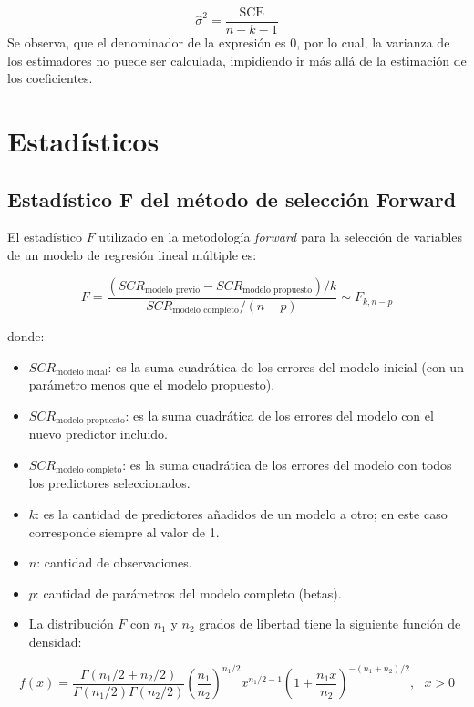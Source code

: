 \documentclass[
  11pt,
]{book}
\providecommand{\tightlist}{%
  \setlength{\itemsep}{0pt}\setlength{\parskip}{0pt}}
\theoremstyle{definition}
\theoremstyle{definition}
\theoremstyle{definition}
\theoremstyle{definition}
\theoremstyle{remark}
\begin{document}
\[
\widehat{\sigma}^2 = \frac{\text{SCE}}{n-k-1}
\]
Se observa, que el denominador de la expresión es 0, por lo cual, la varianza de los estimadores no puede ser calculada, impidiendo ir más allá de la estimación de los coeficientes.

\chapter{Estadísticos}\label{estaduxedsticos}

\section{Estadístico F del método de selección Forward}\label{F-forward}

El estadístico \(F\) utilizado en la metodología \emph{forward} para la selección de variables de un modelo de regresión lineal múltiple es:

\begin{equation}
F = \displaystyle\frac{(SCR_{\text{modelo previo}} - SCR_{\text{modelo propuesto}})/k}{SCR_{\text{modelo completo}}/(n-p)} \sim F_{k, n-p}
\label{eq:EstadisticoFforward}
\end{equation}

donde:

\begin{itemize}
\tightlist
\item
  \(SCR_{\text{modelo incial}}\): es la suma cuadrática de los errores del modelo inicial (con un parámetro menos que el modelo propuesto).
\item
  \(SCR_{\text{modelo propuesto}}\): es la suma cuadrática de los errores del modelo con el nuevo predictor incluido.
\item
  \(SCR_{\text{modelo completo}}\): es la suma cuadrática de los errores del modelo con todos los predictores seleccionados.
\item
  \(k\): es la cantidad de predictores añadidos de un modelo a otro; en este caso corresponde siempre al valor de 1.
\item
  \(n\): cantidad de observaciones.
\item
  \(p\): cantidad de parámetros del modelo completo (betas).
\item
  La distribución \(F\) con \(n_1\) y \(n_2\) grados de libertad tiene la siguiente función de densidad:
\end{itemize}

\begin{equation}
f(x) = \frac{\Gamma(n_1/2+n_2/2)}{\Gamma(n_1/2)\Gamma(n_2/2)}\left(\frac{n_1}{n_2}\right)^{n_1/2}x^{n_1/2-1}\left(1+\frac{n_1x}{n_2}\right)^{-(n_1 + n_2)/2}, \text{ }x>0
\label{eq:distribucionF}
\end{equation}
\end{document}
